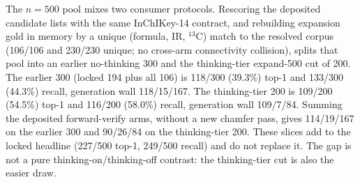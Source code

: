 The \(n{=}500\) pool mixes two consumer protocols.
Rescoring the deposited candidate lists with the same InChIKey-14
contract, and rebuilding expansion gold in memory by a unique
(formula, IR, \(^{13}\)C) match to the resolved corpus
(106/106 and 230/230 unique; no cross-arm connectivity collision),
splits that pool into an earlier no-thinking 300 and the thinking-tier
expand-500 cut of 200.
The earlier 300 (locked 194 plus all 106) is 118/300 (39.3\%) top-1
and 133/300 (44.3\%) recall, generation wall 118/15/167.
The thinking-tier 200 is 109/200 (54.5\%) top-1 and 116/200 (58.0\%)
recall, generation wall 109/7/84.
Summing the deposited forward-verify arms, without a new chamfer pass,
gives 114/19/167 on the earlier 300 and 90/26/84 on the thinking-tier 200.
These slices add to the locked headline (227/500 top-1, 249/500 recall)
and do not replace it.
The gap is not a pure thinking-on/thinking-off contrast:
the thinking-tier cut is also the easier draw.
